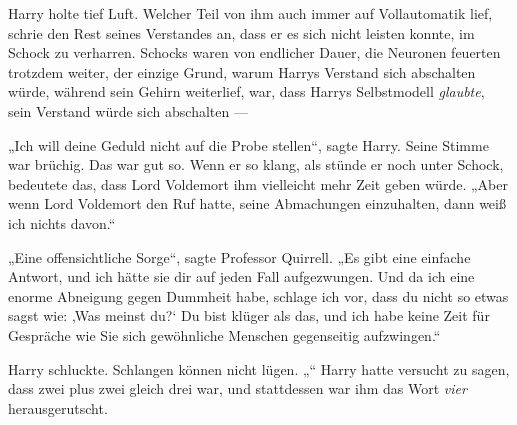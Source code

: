 Harry holte tief Luft. Welcher Teil von ihm auch immer auf Vollautomatik lief, schrie den Rest seines Verstandes an, dass er es sich nicht leisten konnte, im Schock zu verharren. Schocks waren von endlicher Dauer, die Neuronen feuerten trotzdem weiter, der einzige Grund, warum Harrys Verstand sich abschalten würde, während sein Gehirn weiterlief, war, dass Harrys Selbstmodell \emph{glaubte}, sein Verstand würde sich abschalten —

„Ich will deine Geduld nicht auf die Probe stellen“, sagte Harry.
Seine Stimme war brüchig. Das war gut so. Wenn er so klang, als stünde er noch unter Schock, bedeutete das, dass Lord Voldemort ihm vielleicht mehr Zeit geben würde.
„Aber wenn Lord Voldemort den Ruf hatte, seine Abmachungen einzuhalten, dann weiß ich nichts davon.“

„Eine offensichtliche Sorge“, sagte Professor Quirrell.
„Es gibt eine einfache Antwort, und ich hätte sie dir auf jeden Fall aufgezwungen.  Und da ich eine enorme Abneigung gegen Dummheit habe, schlage ich vor, dass du nicht so etwas sagst wie: ‚Was meinst du?‘ Du bist klüger als das, und ich habe keine Zeit für Gespräche wie Sie sich gewöhnliche Menschen gegenseitig aufzwingen.“

Harry schluckte. Schlangen können nicht lügen. „“
Harry hatte versucht zu sagen, dass zwei plus zwei gleich drei war, und stattdessen war ihm das Wort \emph{vier} herausgerutscht.

